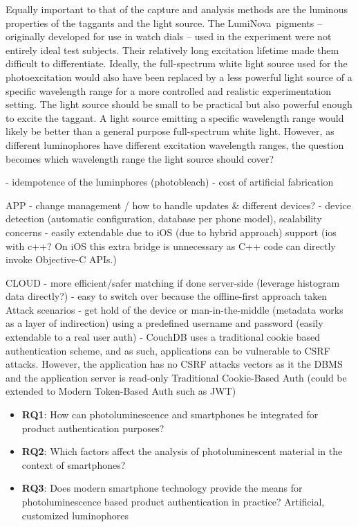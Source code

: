 \documentclass[thesis.tex]{subfiles}
\begin{document}
Equally important to that of the capture and analysis methods are the luminous properties of the taggants and the light source. The LumiNova\textregistered\ pigments -- originally developed for use in watch dials -- used in the experiment were not entirely ideal test subjects. Their relatively long excitation lifetime made them difficult to differentiate. Ideally, the full-spectrum white light source used for the photoexcitation would also have been replaced by a less powerful light source of a specific wavelength range for a more controlled and realistic experimentation setting. The light source should be small to be practical but also powerful enough to excite the taggant. A light source emitting a specific wavelength range would likely be better than a general purpose full-spectrum white light. However, as different luminophores have different excitation wavelength ranges, the question becomes which wavelength range the light source should cover?



- idempotence of the luminphores (photobleach)
- cost of artificial fabrication


APP
- change management / how to handle updates \& different devices?
- device detection (automatic configuration, database per phone model), scalability concerns
- easily extendable due to iOS (due to hybrid approach) support (ios with c++? On iOS this extra bridge is unnecessary as C++ code can directly invoke Objective-C APIs.)

CLOUD
- more efficient/safer matching if done server-side (leverage histogram data directly?)
  - easy to switch over because the offline-first approach taken
Attack scenarios
- get hold of the device or man-in-the-middle (metadata works as a layer of indirection)
using a predefined username and password (easily extendable to a real user auth)
- CouchDB uses a traditional cookie based authentication scheme, and as such, applications can be vulnerable to CSRF attacks. However, the application has no CSRF attacks vectors as it the DBMS and the application server is read-only
Traditional Cookie-Based Auth (could be extended to Modern Token-Based Auth such as JWT)


\begin{itemize}
  \item \textbf{RQ1}: How can photoluminescence and smartphones be integrated for product authentication purposes?
  \item \textbf{RQ2}: Which factors affect the analysis of photoluminescent material in the context of smartphones?
  \item \textbf{RQ3}: Does modern smartphone technology provide the means for photoluminescence based product authentication in practice?
    Artificial, customized luminophores
\end{itemize}
\end{document}
